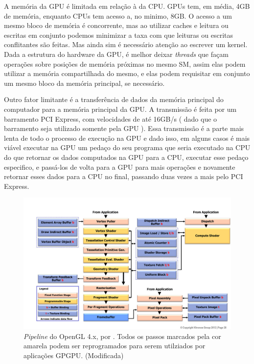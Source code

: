    A memória da GPU é limitada em relação à da CPU. GPUs tem, em média, 4GB
de memória, enquanto CPUs tem acesso a, no minimo, 8GB. O acesso a um mesmo bloco de memória é concorrente, mas ao utilizar caches e leitura 
ou escritas em conjunto podemos minimizar a taxa com que leituras ou escritas conflitantes são feitas. Mas ainda sim é 
necessário atenção ao escrever um kernel. Dada a estrutura do hardware da GPU, é melhor deixar \textit{threads} que façam 
operações sobre posições de memória próximas no mesmo SM, assim elas podem utilizar a memória compartilhada do mesmo, e 
elas podem requisitar em conjunto um mesmo bloco da memória principal, se necessário.

    Outro fator limitante é a transferência de dados da memória principal do computador para a memória 
principal da GPU. A transmissão é feita por um barramento PCI Express, com velocidades de até 16GB/s ( dado que o
barramento seja utilizado somente pela GPU ). Essa transmissão é a parte mais lenta de todo o
processo de execução na GPU e dado isso, em alguns casos é mais viável executar na GPU um pedaço do seu programa que 
seria executado na CPU do que retornar os dados computados na GPU para a CPU, executar esse pedaço especifico, e 
passá-los de volta para a GPU para mais operações e novamente retornar esses dados para a CPU no final, passando duas 
vezes a mais pelo PCI Express.

\begin{figure}[H]
    \centering
    \includegraphics[width=1\textwidth]{figuras/pipeline.jpg}
    \caption{\textit{Pipeline} do OpenGL 4.x, por \citep{pipeline}. Todos os passos marcados pela cor amarela podem
    ser reprogramados para serem utilziados por aplicações GPGPU. (Modificada)}
    \label{fig:pipeline}
\end{figure}

